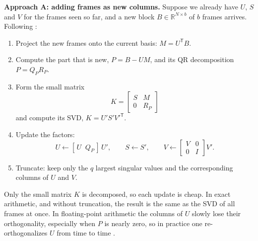 \documentclass[11pt,a4paper]{article}
\begin{document}
\textbf{Approach A: adding frames as new columns.} Suppose we already have $U$, $S$ and $V$ for the frames seen so far,
and a new block $B \in \mathbb{R}^{N \times b}$ of $b$ frames arrives.
Following \cite[Section 2.2]{kuehl}:
\begin{enumerate}
  \item Project the new frames onto the current basis: $M = U^{\mathsf{T}} B$.
  \item Compute the part that is new, $P = B - U M$, and its QR
        decomposition $P = Q_P R_P$.
  \item Form the small matrix
        \begin{equation*}
          K = \begin{bmatrix} S & M \\ 0 & R_P \end{bmatrix}
        \end{equation*}
        and compute its SVD, $K = U' S' V'^{\mathsf{T}}$.
  \item Update the factors:
        \begin{equation*}
          U \leftarrow [\,U \;\; Q_P\,]\, U', \qquad
          S \leftarrow S', \qquad
          V \leftarrow \begin{bmatrix} V & 0 \\ 0 & I \end{bmatrix} V'.
        \end{equation*}
  \item Truncate: keep only the $q$ largest singular values and the
        corresponding columns of $U$ and $V$.
\end{enumerate}
Only the small matrix $K$ is decomposed, so each update is cheap. In exact
arithmetic, and without truncation, the result is the same as the SVD of all
frames at once. In floating-point arithmetic the columns of $U$ slowly lose
their orthogonality, especially when $P$ is nearly zero, so in practice one
re-orthogonalizes $U$ from time to time \cite{kuehl}.
\end{document}
